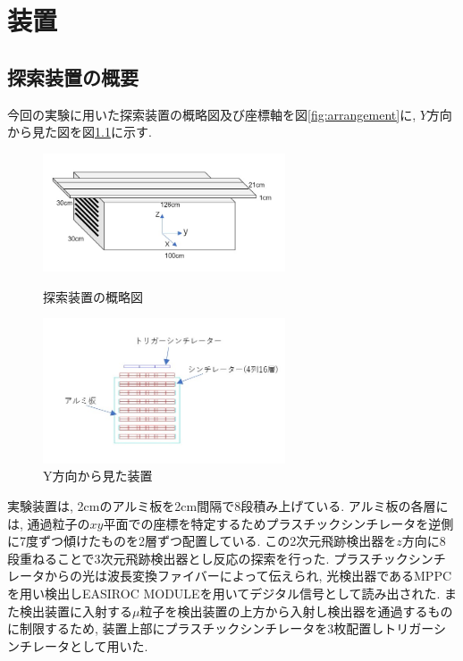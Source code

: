 \chapter{装置} \label{equipment}
\section{探索装置の概要}
今回の実験に用いた探索装置の概略図及び座標軸を図\ref{fig:arrangement}に, $Y$方向から見た図を図\ref{fig:y_arrangement}に示す.

\begin{figure}[H]
    \begin{minipage}[b]{0.47\linewidth}
        \centering
        \includegraphics[height=3.5cm]{img/equipment.jpg}
        \caption{探索装置の概略図}
        \label{fig:arrangement}
    \end{minipage}
    \begin{minipage}[b]{0.47\linewidth}
        \centering
        \includegraphics[height=4.3cm]{img/equipment_y.jpg}
        \caption{Y方向から見た装置}
        \label{fig:y_arrangement}
    \end{minipage}
\end{figure}

実験装置は, 2cmのアルミ板を2cm間隔で8段積み上げている.
アルミ板の各層には, 通過粒子の$xy$平面での座標を特定するためプラスチックシンチレータを逆側に7度ずつ傾けたものを2層ずつ配置している.
この2次元飛跡検出器を$z$方向に8段重ねることで3次元飛跡検出器とし反応の探索を行った.
プラスチックシンチレータからの光は波長変換ファイバーによって伝えられ, 光検出器であるMPPCを用い検出しEASIROC MODULEを用いてデジタル信号として読み出された.
また検出装置に入射する$\mu$粒子を検出装置の上方から入射し検出器を通過するものに制限するため, 装置上部にプラスチックシンチレータを3枚配置しトリガーシンチレータとして用いた.


